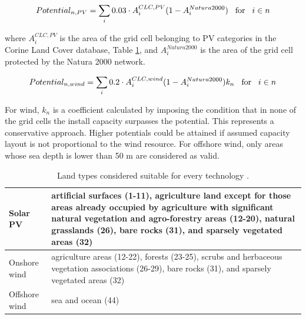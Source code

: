 \documentclass[3p]{elsarticle} %
\begin{document}
\begin{equation}
	Potential_{n, PV} =\sum_i 0.03 \cdot A^{CLC, PV}_i (1- A^{Natura 2000}_i) \hspace{0.3cm} \text{for} \hspace{0.3cm} i \in n
\end{equation}

where $A^{CLC, PV}_i$ is the area of the grid cell belonging to PV categories in the Corine Land Cover database, Table \ref{tab_Corine}, and $A^{Natura 2000}_i$ is the area of the grid cell protected by the Natura 2000 network. 

\begin{equation}
	Potential_{n, wind} = \sum_i 0.2 \cdot A^{CLC, wind}_i (1- A^{Natura 2000}_i) k_n \hspace{0.3cm} \text{for} \hspace{0.3cm}  i \in n
\end{equation}

For wind, $k_n$ is a coefficient calculated by imposing the condition that in none of the grid cells the install capacity surpasses the potential. This represents a conservative approach. Higher potentials could be attained if assumed capacity layout is not proportional to the wind resource. For offshore wind, only areas whose sea depth is lower than 50 m are considered as valid. 


\begin{table}[!b]
\footnotesize
\centering
\begin{threeparttable}
\caption{Land types considered suitable for every technology \cite{Corine_2014, Scholz_2012}.} \label{tab_Corine}
\centering
\begin{tabularx}{13cm}{lp{10cm}}
\toprule
Solar PV  & artificial surfaces (1-11), agriculture land except for those areas already occupied by agriculture with significant natural vegetation and agro-forestry areas (12-20), natural grasslands (26),
bare rocks (31), and sparsely vegetated areas (32) \\
\midrule
Onshore wind & agriculture areas (12-22), forests (23-25), scrubs and herbaceous vegetation associations (26-29), bare rocks (31), and sparsely vegetated areas (32) \\
\midrule
Offshore wind & sea and ocean (44) \\
\bottomrule
\end{tabularx}
\end{threeparttable}
\end{table}
\end{document}
